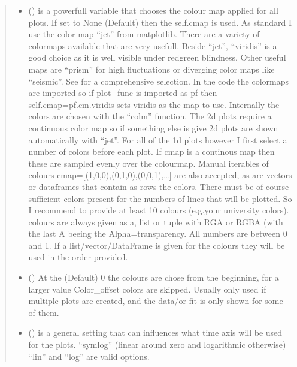 \documentclass[letterpaper,10pt,english]{sphinxmanual}
\begin{document}
\begin{fulllineitems}
\begin{quote}
\begin{description}
\begin{itemize}
\item {} 
 (\sphinxstyleliteralemphasis{\sphinxupquote{, }}) \textendash{} is a powerfull variable that chooses the colour map applied for all plots. If set to
None (Default) then the self.cmap is used.
As standard I use the color map “jet” from matplotlib. There are a variety of colormaps
available that are very usefull. Beside “jet”, “viridis” is a good choice as it is well
visible under red\sphinxhyphen{}green blindness. Other useful maps are “prism” for high fluctuations
or diverging color maps like “seismic”.
See  for a comprehensive
selection. In the code the colormaps are imported so if plot\_func is imported as pf then
self.cmap=pf.cm.viridis sets viridis as the map to use. Internally the colors are chosen
with the “colm” function. The 2d plots require a continuous color map so if something
else is give 2d plots are shown automatically with “jet”. For all of the 1d plots however
I first select a number of colors before each plot. If cmap is a continous map then these
are sampled evenly over the colourmap. Manual iterables of colours
cmap={[}(1,0,0),(0,1,0),(0,0,1),…{]} are also accepted, as are vectors or dataframes that
contain as rows the colors. There must be of course sufficient colors present for
the numbers of lines that will be plotted. So I recommend to provide at least 10 colours
(e.g.your university colors). colours are always given as a, list or tuple with RGA or RGBA
(with the last A beeing the Alpha=transparency. All numbers are between 0 and 1.
If a list/vector/DataFrame is given for the colours they will be used in the order provided.

\item {} 
 (\sphinxstyleliteralemphasis{\sphinxupquote{, }}) \textendash{} At the (Default) 0 the colours are chose from the beginning, for a larger value Color\_offset
colors are skipped. Usually only used if multiple plots are created, and the data/or fit is
only shown for some of them.

\item {} 
 () \textendash{} is a general setting that can influences what time axis will be used for the plots.
“symlog” (linear around zero and logarithmic otherwise) “lin” and “log” are valid options.


\end{itemize}
\end{description}
\end{quote}
\end{fulllineitems}
\end{document}

